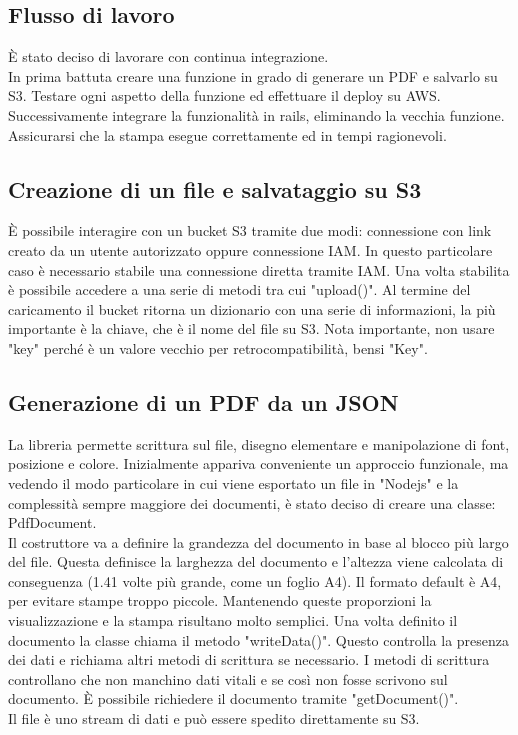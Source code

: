 \documentclass[12pt]{article}
\begin{document}
\subsection{Flusso di lavoro}
È stato deciso di lavorare con continua integrazione. 
\\ In prima battuta creare una funzione in grado di generare un PDF e salvarlo 
su S3. Testare ogni aspetto della funzione ed effettuare il deploy su AWS. 
\\ Successivamente integrare la funzionalità in rails, eliminando la vecchia 
funzione. Assicurarsi che la stampa esegue correttamente ed in tempi ragionevoli.

\subsection{Creazione di un file e salvataggio su S3}
È possibile interagire con un bucket S3 tramite due modi: connessione con link 
creato da un utente autorizzato oppure connessione IAM. In questo particolare 
caso è necessario stabile una connessione diretta tramite IAM. Una volta stabilita 
è possibile accedere a una serie di metodi tra cui "upload()". Al termine del 
caricamento il bucket ritorna un dizionario con una serie di informazioni, la 
più importante è la chiave, che è il nome del file su S3. Nota importante, 
non usare "key" perché è un valore vecchio per retrocompatibilità, bensi "Key". 

\subsection{Generazione di un PDF da un JSON}
La libreria permette scrittura sul file, disegno elementare e manipolazione di 
font, posizione e colore.
Inizialmente appariva conveniente un approccio funzionale, ma vedendo il modo 
particolare in cui viene esportato un file in "Nodejs" e la complessità sempre 
maggiore dei documenti, è stato deciso di creare una classe: PdfDocument. 
\\
Il costruttore va a definire la grandezza del documento in base al blocco più 
largo del file.
Questa definisce la larghezza del documento e l'altezza viene calcolata di
conseguenza (1.41 volte più grande, come un foglio A4).
Il formato default è A4, per evitare stampe troppo piccole.
Mantenendo queste proporzioni la visualizzazione e la stampa risultano molto 
semplici.
Una volta definito il documento la classe chiama il metodo "writeData()".
Questo controlla la presenza dei dati e richiama altri metodi di scrittura 
se necessario.
I metodi di scrittura controllano che non manchino dati vitali e se così non fosse 
scrivono sul documento. 
È possibile richiedere il documento tramite "getDocument()". 
\\ Il file è uno stream di dati e può essere spedito direttamente su S3. 
\end{document}
